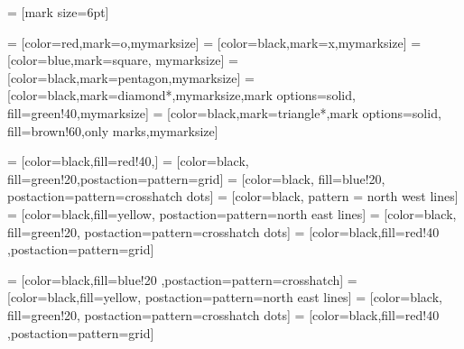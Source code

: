 \newenvironment{customlegend}[1][]{%
    \begingroup
    \csname pgfplots@init@cleared@structures\endcsname
    \pgfplotsset{#1}%
}{%
    \csname pgfplots@createlegend\endcsname
    \endgroup
}%

\def\addlegendimage{\csname pgfplots@addlegendimage\endcsname}
\def\addlegendentry{\csname pgfplots@addlegendentry\endcsname}

 = [mark size=6pt]

 = [color=red,mark=o,mymarksize]
 = [color=black,mark=x,mymarksize]
 = [color=blue,mark=square,  mymarksize]
 = [color=black,mark=pentagon,mymarksize]
 = [color=black,mark=diamond*,mymarksize,mark options={solid, fill=green!40},mymarksize]
 = [color=black,mark=triangle*,mark options={solid, fill=brown!60,only marks},mymarksize]


 = [color=black,fill=red!40,]
 = [color=black, fill=green!20,postaction={pattern=grid}]
 = [color=black, fill=blue!20, postaction={pattern=crosshatch dots}]
 = [color=black, pattern = north west lines]
 = [color=black,fill=yellow, postaction={pattern=north east lines}]
 = [color=black, fill=green!20, postaction={pattern=crosshatch dots}]
 = [color=black,fill=red!40 ,postaction={pattern=grid}]

  = [color=black,fill=blue!20 ,postaction={pattern=crosshatch}]
 = [color=black,fill=yellow, postaction={pattern=north east lines}]
 = [color=black, fill=green!20, postaction={pattern=crosshatch dots}]
 = [color=black,fill=red!40 ,postaction={pattern=grid}]

